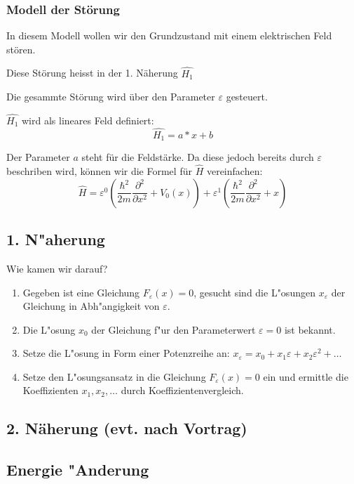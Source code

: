 \begin{refsection}
\subsubsection{ Modell der St\"orung }
In diesem Modell wollen wir den Grundzustand mit einem elektrischen Feld st\"oren.

Diese St\"orung heisst in der 1. N\"aherung $\hat{H_1}$

Die gesammte St\"orung wird \"uber den Parameter $\varepsilon$ gesteuert.

$\hat{H_1}$ wird als lineares Feld definiert:
\[
  \hat{H_1} = a*x + b
\]

Der Parameter $a$ steht f\"ur die Feldst\"arke. Da diese jedoch bereits durch 
$\varepsilon$ beschriben wird, k\"onnen wir die Formel f\"ur $\hat{H}$ vereinfachen:
\[
  \hat{H} = \varepsilon^0 ( \frac{\hbar^2}{2m} \frac{\partial^2}{\partial x^2} + V_0(x) )
            + \varepsilon^1 ( \frac{\hbar^2}{2m} \frac{\partial^2}{\partial x^2} + x )
\]


\subsection{ 1. N"aherung }

Wie kamen wir darauf?

\begin{enumerate}
\item Gegeben ist eine Gleichung $F_\varepsilon(x)=0$, gesucht
sind die L"osungen $x_\varepsilon$ der Gleichung in Abh"angigkeit von
$\varepsilon$.
\item Die L"osung $x_0$ der Gleichung f"ur den Parameterwert $\varepsilon=0$
ist bekannt.
\item Setze die L"osung in Form einer Potenzreihe an:
$x_\varepsilon = x_0+x_1\varepsilon+x_2\varepsilon^2+\dots$
\item Setze den L"osungsansatz in die Gleichung $F_\varepsilon(x)=0$ ein
und ermittle die Koeffizienten $x_1,x_2,\dots$ durch Koeffizientenvergleich.
\end{enumerate}

\subsection{ 2. N\"aherung (evt. nach Vortrag) }

\subsection{ Energie "Anderung }


\end{refsection}
